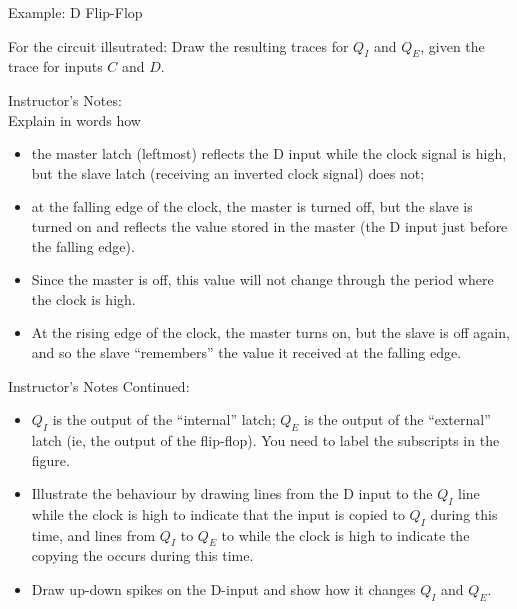 \begin{frame}{Example: D Flip-Flop}
\begin{tcolorbox}[enhanced,attach boxed title to top center={yshift=-3mm,yshifttext=-1mm},
  colback=red!5!white,colframe=red!75!black,colbacktitle=red!80!black,
  title=Try this,fonttitle=\bfseries,
  boxed title style={size=small,colframe=red!50!black} ]
  For the circuit illsutrated:
Draw the resulting traces for $Q_I$ and $Q_E$, given the trace for inputs $C$ and $D$.
\vspace{-4mm}
\end{tcolorbox}    
\end{frame}
\BNotes\ifnum{}
\begin{frame}[fragile]
Instructor's Notes:\\
Explain in words how 
\begin{itemize}
\item the master latch (leftmost) reflects the D input
	while the clock signal is high, but the slave latch (receiving an
	inverted clock signal) does not; 
\item at the falling edge of the clock, the
	master is turned off, but the slave is turned on and reflects the
	value stored in the master (the D input just before the falling
	edge). 
\item Since the master is off, this value will not change through the
	period where the clock is high. 
\item At the rising edge of the clock, the
	master turns on, but the slave is off again, and so the slave
	``remembers'' the value it received at the falling edge.
\end{itemize}
\end{frame}


\begin{frame}[fragile]
Instructor's Notes Continued:
\begin{itemize}
\item $Q_I$ is the output of the ``internal'' latch; 
	$Q_E$ is the output of the ``external'' latch (ie, the output
	of the flip-flop).  You need to label the subscripts in the
	figure.
\item Illustrate the behaviour by drawing lines from the D input to
	the $Q_I$ line while the clock is high to indicate that the
	input is copied to $Q_I$ during this time, and lines from $Q_I$
	to $Q_E$ to while the clock is high to indicate the copying
	the occurs during this time.
\item Draw up-down spikes on the D-input and show how it changes $Q_I$ and
	$Q_E$.
\end{itemize}
\end{frame}
\fi\ENotes

